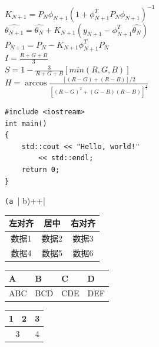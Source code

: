 \documentclass{ctexart}
\begin{document}
$ K_{N+1}=P_N\phi_{N+1}(1+\phi_{N+1}^{T}P_N\phi_{N+1})^{-1} $\\
$ \widehat{\theta_{N+1}}=\widehat{\theta_N}+K_{N+1}(y_{N+1}-\phi_{N+1}^T\widehat{\theta_N}) $\\
$ P_{N+1}=P_N-K_{N+1}\phi_{N+1}^TP_N $\\


$ I=\frac{R+G+B}{3} $\\
$ S=1-\frac{3}{R+G+B}[min(R,G,B)] $\\
$ H=\arccos\frac{[(R-G)+(R-B)]/2}{[(R-G)^2+(G-B)(R-B)]^\frac{1}{2}} $




\begin{verbatim}
#include <iostream>
int main()
{
    std::cout << "Hello, world!"
        << std::endl;
    return 0;
}
\end{verbatim}
\verb|(a || b)++|
\\
\centering
\begin{tabular}{|c|c|c|}
  \hline
  左对齐 & 居中 & 右对齐 \\
  \hline
  数据1 & 数据2 & 数据3 \\
  \cline{1-2}
  数据4 & 数据5 & 数据6 \\
  \hline
\end{tabular}
\par
\begin{tabularx}{14em}
  {|*{4}{>{\centering\arraybackslash}X|}}
  \hline
  A & B & C & D \\
  \hline
  ABC & BCD & CDE & DEF \\
  \hline
\end{tabularx}
\par
\begin{tabular}{|c|c|c|}
    \hline
    1 & 2 & 3 \\
    \hline
    \multicolumn{2}{|c|}{3} & 4\\
    \hline
    
\end{tabular}
\par
\end{document}
